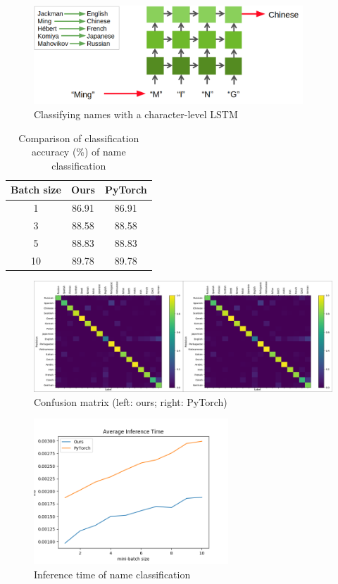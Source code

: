 \documentclass{article}
\begin{document}
\begin{figure}[H]
\centering
\includegraphics[width=0.9\textwidth]{application.png}
\caption{Classifying names with a character-level LSTM}
\label{name-app}
\end{figure}

\begin{table}[H]
\centering
\caption{Comparison of classification accuracy (\%) of name classification}
\label{name-accuracy}
\begin{tabular}{@{}c|cc@{}}
\toprule
Batch size & Ours & \multicolumn{1}{c}{PyTorch} \\ \midrule
1 & 86.91 & 86.91 \\
3 & 88.58 & 88.58 \\
5 & 88.83 & 88.83 \\
10 & 89.78 & 89.78 \\ \bottomrule
\end{tabular}
\end{table}

\begin{figure}[H]
\centering
\includegraphics[width=1.0\textwidth]{confusion.png}
\caption{Confusion matrix (left: ours; right: PyTorch)}
\label{confusion}
\end{figure}

\begin{figure}[H]
\centering
\includegraphics[width=0.65\textwidth]{name.png}
\caption{Inference time of name classification }
\label{name-time}
\end{figure}
\end{document}
